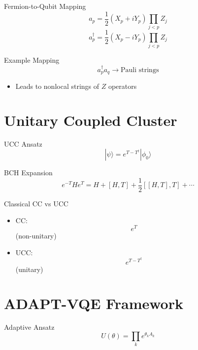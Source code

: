 \documentclass{beamer}
\begin{document}
\begin{frame}{Fermion-to-Qubit Mapping}
\[
a_p = \frac{1}{2}(X_p + iY_p)\prod_{j<p} Z_j
\]
\[
a_p^\dagger = \frac{1}{2}(X_p - iY_p)\prod_{j<p} Z_j
\]
\end{frame}


\begin{frame}{Example Mapping}
\[
a_p^\dagger a_q \rightarrow \text{Pauli strings}
\]
\begin{itemize}
\item Leads to nonlocal strings of $Z$ operators
\end{itemize}
\end{frame}

\section{Unitary Coupled Cluster}

\begin{frame}{UCC Ansatz}
\[
|\psi\rangle = e^{T - T^\dagger} |\phi_0\rangle
\]
\end{frame}


\begin{frame}{BCH Expansion}
\[
e^{-T}He^{T} = H + [H,T] + \frac{1}{2}[[H,T],T] + \cdots
\]
\end{frame}


\begin{frame}{Classical CC vs UCC}
\begin{itemize}
\item CC:
\[
e^{T}
\]
(non-unitary)
\item UCC:
\[
e^{T - T^\dagger}
\]
(unitary)
\end{itemize}
\end{frame}

\section{ADAPT-VQE Framework}

\begin{frame}{Adaptive Ansatz}
\[
U(\theta) = \prod_k e^{\theta_k A_k}
\]
\end{frame}
\end{document}
